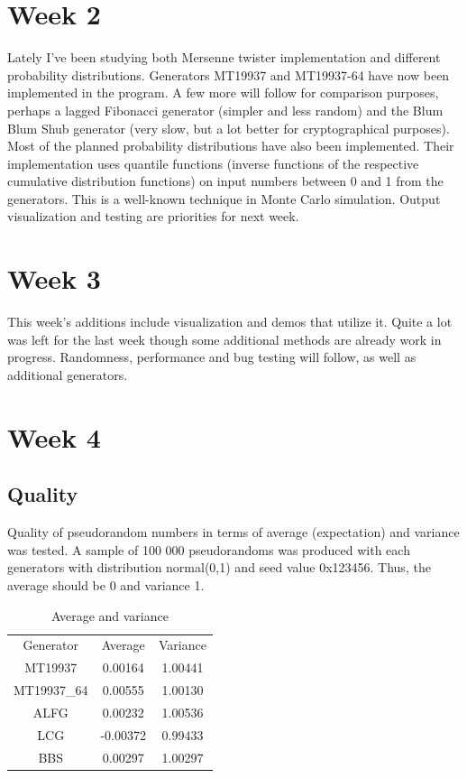 \documentclass[reprint,aip]{revtex4-1}
\begin{document}
\section{Week 2}

Lately I've been studying both Mersenne twister implementation and different probability distributions. Generators MT19937 and MT19937-64 have now been implemented in the program. A few more will follow for comparison purposes, perhaps a lagged Fibonacci generator (simpler and less random) and the Blum Blum Shub generator (very slow, but a lot better for cryptographical purposes). Most of the planned probability distributions have also been implemented. Their implementation uses quantile functions (inverse functions of the respective cumulative distribution functions) on input numbers between 0 and 1 from the generators. This is a well-known technique in Monte Carlo simulation. Output visualization and testing are priorities for next week.

\section{Week 3}

This week's additions include visualization and demos that utilize it. Quite a lot was left for the last week though some additional methods are already work in progress. Randomness, performance and bug testing will follow, as well as additional generators.

\section{Week 4}

\subsection{Quality}

Quality of pseudorandom numbers in terms of average (expectation) and variance was tested. A sample of 100 000 pseudorandoms was produced with each generators with distribution normal(0,1) and seed value 0x123456. Thus, the average should be 0 and variance 1.

\begin{table}[h]
\begin{tabular}{c|c|c}
Generator & Average & Variance \\
MT19937 & 0.00164 & 1.00441 \\
MT19937\_64 & 0.00555 & 1.00130 \\
ALFG & 0.00232 & 1.00536 \\
LCG & -0.00372 & 0.99433 \\
BBS & 0.00297 & 1.00297 \\
\end{tabular}
\caption{Average and variance}
\end{table}
\end{document}
